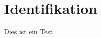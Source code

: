 
\chapter{Identifikation}
\label{chap:identifikation}

Dies ist ein Test































